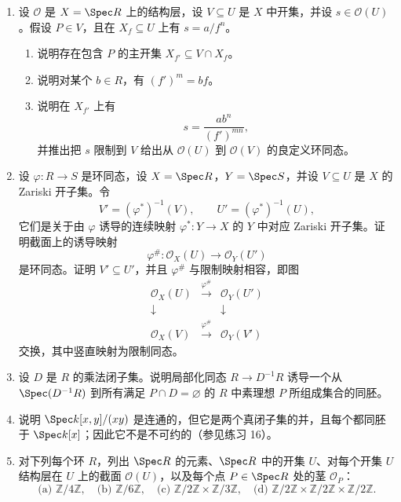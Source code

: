 \begin{enumerate}[label=\arabic*.]
	\item 设 $\mathcal O$ 是 $X=\Spec R$ 上的结构层，设 $V\subseteq U$ 是 $X$ 中开集，并设 $s\in\mathcal O(U)$。假设 $P\in V$，且在 $X_f\subseteq U$ 上有 $s=a/f^n$。
	\begin{enumerate}[label=(\alph*)]
		\item 说明存在包含 $P$ 的主开集 $X_{f'}\subseteq V\cap X_f$。
		\item 说明对某个 $b\in R$，有 $(f')^m=bf$。
		\item 说明在 $X_{f'}$ 上有
		\[
		s=\frac{ab^n}{(f')^{mn}},
		\]
		并推出把 $s$ 限制到 $V$ 给出从 $\mathcal O(U)$ 到 $\mathcal O(V)$ 的良定义环同态。
	\end{enumerate}
	
	\item 设 $\varphi:R\to S$ 是环同态，设 $X=\Spec R$，$Y=\Spec S$，并设 $V\subseteq U$ 是 $X$ 的 Zariski 开子集。令
	\[
	V'=(\varphi^*)^{-1}(V),
	\qquad
	U'=(\varphi^*)^{-1}(U),
	\]
	它们是关于由 $\varphi$ 诱导的连续映射 $\varphi^*:Y\to X$ 的 $Y$ 中对应 Zariski 开子集。证明截面上的诱导映射
	\[
	\varphi^\#:\mathcal O_X(U)\longrightarrow\mathcal O_Y(U')
	\]
	是环同态。证明 $V'\subseteq U'$，并且 $\varphi^\#$ 与限制映射相容，即图
	\[
	\begin{array}{ccc}
		\mathcal O_X(U)&\xrightarrow{\varphi^\#}&\mathcal O_Y(U')\\
		\downarrow&&\downarrow\\
		\mathcal O_X(V)&\xrightarrow{\varphi^\#}&\mathcal O_Y(V')
	\end{array}
	\]
	交换，其中竖直映射为限制同态。
	
	\item 设 $D$ 是 $R$ 的乘法闭子集。说明局部化同态 $R\to D^{-1}R$ 诱导一个从 $\Spec(D^{-1}R)$ 到所有满足 $P\cap D=\varnothing$ 的 $R$ 中素理想 $P$ 所组成集合的同胚。
	
	\item 说明 $\Spec k[x,y]/(xy)$ 是连通的，但它是两个真闭子集的并，且每个都同胚于 $\Spec k[x]$；因此它不是不可约的（参见练习 16）。
	
	\item 对下列每个环 $R$，列出 $\Spec R$ 的元素、$\Spec R$ 中的开集 $U$、对每个开集 $U$ 结构层在 $U$ 上的截面 $\mathcal O(U)$，以及每个点 $P\in\Spec R$ 处的茎 $\mathcal O_P$：
	\[
	\text{(a) }\mathbb Z/4\mathbb Z,
	\quad
	\text{(b) }\mathbb Z/6\mathbb Z,
	\quad
	\text{(c) }\mathbb Z/2\mathbb Z\times\mathbb Z/3\mathbb Z,
	\quad
	\text{(d) }\mathbb Z/2\mathbb Z\times\mathbb Z/2\mathbb Z\times\mathbb Z/2\mathbb Z.
	\]
	

\end{enumerate}
